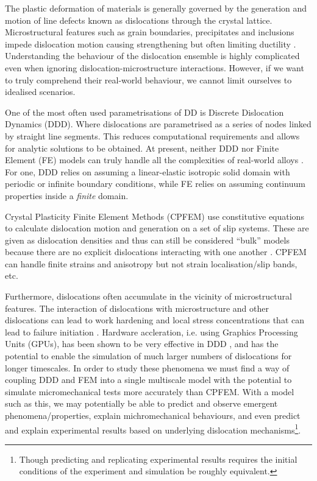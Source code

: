 The plastic deformation of materials is generally governed by the generation and motion of line defects known as dislocations through the crystal lattice. Microstructural features such as grain boundaries, precipitates and inclusions impede dislocation motion causing strengthening but often limiting ductility \cite{init_fail_dln}. Understanding the behaviour of the dislocation ensemble is highly complicated even when ignoring dislocation-microstructure interactions. However, if we want to truly comprehend their real-world behaviour, we cannot limit ourselves to idealised scenarios.

One of the most often used parametrisations of DD is Discrete Dislocation Dynamics (DDD). Where dislocations are parametrised as a series of nodes linked by straight line segments. This reduces computational requirements and allows for analytic solutions to be obtained. At present, neither DDD nor Finite Element (FE) models can truly handle all the complexities of real-world alloys \cite{ddd_fem1, paradis, fem_ddd2, fem_ddd}. For one, DDD relies on assuming a linear-elastic isotropic solid domain with periodic or infinite boundary conditions, while FE relies on assuming continuum properties inside a \emph{finite} domain.

Crystal Plasticity Finite Element Methods (CPFEM) use constitutive equations to calculate dislocation motion and generation on a set of slip systems. These are given as dislocation densities and thus can still be considered ``bulk'' models because there are no explicit dislocations interacting with one another \cite{cpfem1}. CPFEM can handle finite strains and anisotropy but not strain localisation/slip bands, etc.

Furthermore, dislocations often accumulate in the vicinity of microstructural features. The interaction of dislocations with microstructure and other dislocations can lead to work hardening and local stress concentrations that can lead to failure initiation \cite{size_effects, dln_ind_hard}. Hardware accleration, i.e. using Graphics Processing Units (GPUs), has been shown to be very effective in DDD \cite{gpu_ddd}, and has the potential to enable the simulation of much larger numbers of dislocations for longer timescales. In order to study these phenomena we must find a way of coupling DDD and FEM into a single multiscale model with the potential to simulate micromechanical tests more accurately than CPFEM. With a model such as this, we may potentially be able to predict and observe emergent phenomena/properties, explain michromechanical behaviours, and even predict and explain experimental results based on underlying dislocation mechanisms\footnote{Though predicting and replicating experimental results requires the initial conditions of the experiment and simulation be roughly equivalent.}.

